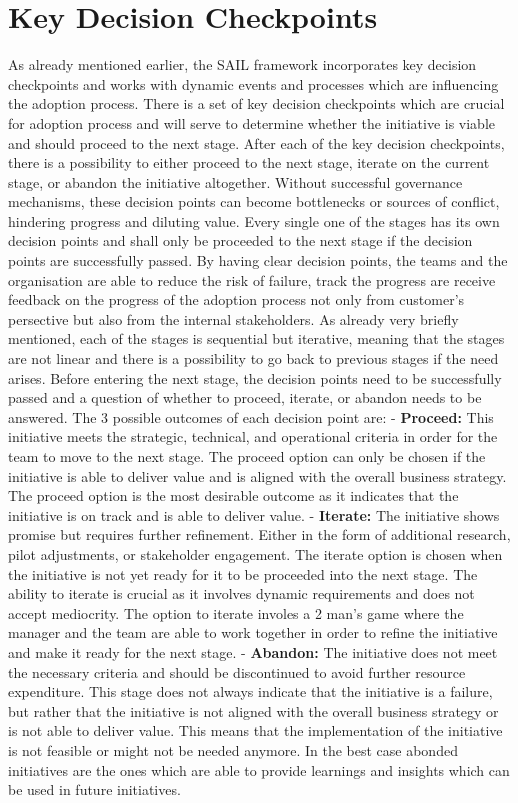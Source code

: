 \documentclass[]{imc-inf}
\begin{document}
\section{Key Decision
	Checkpoints}\label{key-decision-checkpoints}

As already mentioned earlier, the SAIL framework incorporates key
decision checkpoints and works with dynamic events and processes which
are influencing the adoption process. There is a set of key decision
checkpoints which are crucial for adoption process and will serve to
determine whether the initiative is viable and should proceed to the
next stage. After each of the key decision checkpoints, there is a
possibility to either proceed to the next stage, iterate on the current
stage, or abandon the initiative altogether. Without successful
governance mechanisms, these decision points can become bottlenecks or
sources of conflict, hindering progress and diluting value. Every single
one of the stages has its own decision points and shall only be
proceeded to the next stage if the decision points are successfully
passed. By having clear decision points, the teams and the organisation
are able to reduce the risk of failure, track the progress are receive
feedback on the progress of the adoption process not only from
customer's persective but also from the internal stakeholders. As
already very briefly mentioned, each of the stages is sequential but
iterative, meaning that the stages are not linear and there is a
possibility to go back to previous stages if the need arises. Before
entering the next stage, the decision points need to be successfully
passed and a question of whether to proceed, iterate, or abandon needs
to be answered. The 3 possible outcomes of each decision point are: -
\textbf{Proceed:} This initiative meets the strategic, technical, and
operational criteria in order for the team to move to the next stage.
The proceed option can only be chosen if the initiative is able to
deliver value and is aligned with the overall business strategy. The
proceed option is the most desirable outcome as it indicates that the
initiative is on track and is able to deliver value. - \textbf{Iterate:}
The initiative shows promise but requires further refinement. Either in
the form of additional research, pilot adjustments, or stakeholder
engagement. The iterate option is chosen when the initiative is not yet
ready for it to be proceeded into the next stage. The ability to iterate
is crucial as it involves dynamic requirements and does not accept
mediocrity. The option to iterate involes a 2 man's game where the
manager and the team are able to work together in order to refine the
initiative and make it ready for the next stage. - \textbf{Abandon:} The
initiative does not meet the necessary criteria and should be
discontinued to avoid further resource expenditure. This stage does not
always indicate that the initiative is a failure, but rather that the
initiative is not aligned with the overall business strategy or is not
able to deliver value. This means that the implementation of the
initiative is not feasible or might not be needed anymore. In the best
case abonded initiatives are the ones which are able to provide
learnings and insights which can be used in future initiatives.
\end{document}

